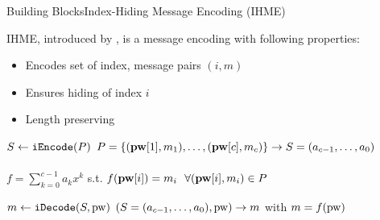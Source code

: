 \documentclass[notes,xcolor=dvipsnames]{beamer}
\begin{document}
\begin{frame}{Building Blocks}{Index-Hiding Message Encoding (IHME)}

	IHME, introduced by \cite{Manulis2010}, is a message encoding with following properties: %
	\begin{itemize}
		\item Encodes set of index, message pairs $(i,m)$
		\item Ensures hiding of index $i$
		\item Length preserving
	\end{itemize}

	\vspace*{1em}

	\pause
	\begin{beamerboxesrounded}[upper=uppercol,lower=lowercol,shadow=true]{$S\gets\mathtt{iEncode}(P)$}
		$P=\{(\mathbf{pw}[1],m_{1}),\dots,(\mathbf{pw}[c],m_{c})\}\rightarrow S=(a_{c-1},\dots,a_0)$\\\\
		$f=\sum^{c-1}_{k=0}a_kx^k$ s.t. $f(\mathbf{pw}[i])=m_{i}~~\forall(\mathbf{pw}[i],m_{i})\in P$
	\end{beamerboxesrounded}
	
	\vspace*{1em}

	\begin{beamerboxesrounded}[upper=uppercol,lower=lowercol,shadow=true]{$m\gets\mathtt{iDecode}(S, \mathrm{pw})$}
		$(S=(a_{c-1},\dots,a_0), \mathrm{pw})\rightarrow m$ with	$m=f(\mathrm{pw})$
	\end{beamerboxesrounded}
	
\end{frame}

%
%	
%
%
%
\end{document}

